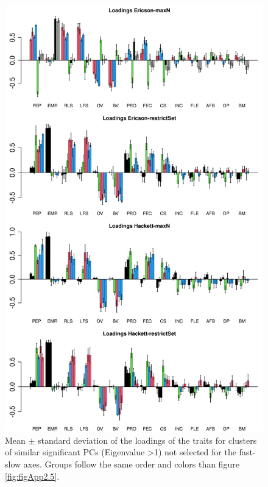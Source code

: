 \begin{figure}[ht!]
\centering
\includegraphics[width=.8\textwidth]{./Figures/Appendix2_1/2nd loadings plots-ALL.png}
\caption[LHT loadings of the secondary axes]{
Mean $\pm$ standard deviation of the loadings of the traits for clusters of
similar significant PCs (Eigenvalue \textgreater{1}) not selected for the
fast-slow axes. Groups follow the same order and colors than figure
\ref{fig:figApp2.5}.}
\label{fig:figApp2.3}
\end{figure}


